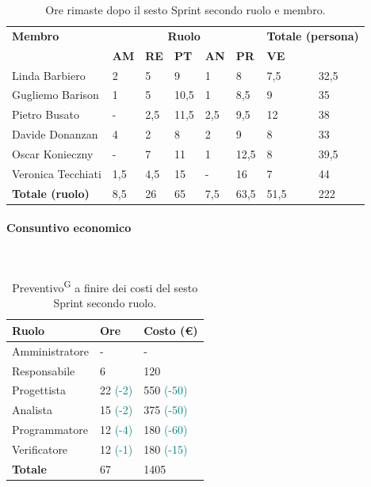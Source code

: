\documentclass[8pt]{article}
\newcommand{\glossterm}[1]{#1\textsuperscript{G}} %
\newcommand{\subsubsubsection}[1]{\paragraph{#1}\mbox{}\\}
\begin{document}
\begin{table}[ht!]
	\centering
	\begin{tabular}{p{3cm} p{1.4cm} p{1.6cm} p{1.5cm} p{1.5cm} p{1.5cm} p{1.5cm} p{2cm}}
		\toprule
        \textbf{Membro} & \multicolumn{5}{c}{\textbf{Ruolo}} & \multicolumn{2}{r}{\textbf{Totale (persona)}}\\
		& \textbf{AM} & \textbf{RE} & \textbf{PT} & \textbf{AN} & \textbf{PR} & \textbf{VE}\\
		\midrule
        Linda Barbiero     & 2    & 5   & 9    & 1   & 8    & 7,5 & 32,5 \\
        Gugliemo Barison   & 1    & 5   & 10,5 & 1   & 8,5  & 9   & 35 \\
        Pietro Busato      & -   & 2,5 & 11,5 & 2,5 & 9,5  & 12  & 38 \\
        Davide Donanzan    & 4    & 2   & 8    & 2   & 9    & 8   & 33 \\
        Oscar Konieczny    & - & 7   & 11   & 1   & 12,5 & 8   & 39,5 \\
        Veronica Tecchiati & 1,5  & 4,5 & 15   & -   & 16   & 7   & 44 \\
        \midrule
        \textbf{Totale (ruolo)} & 8,5 & 26 & 65 & 7,5 & 63,5 & 51,5 & 222 \\
		\bottomrule
	\end{tabular}
	\caption{Ore rimaste dopo il sesto Sprint secondo ruolo e membro.}
	\label{table:Ore rimaste dopo il sesto Sprint secondo ruolo e membro.}
\end{table}
\subsubsubsection{Consuntivo economico}
\begin{table}[ht!]
    \centering
    \begin{tabular}{p{4cm} p{1.8cm} p{2.2cm}}
        \toprule
        \textbf{Ruolo} & \textbf{Ore} & \textbf{Costo (€)} \\
        \midrule
        Amministratore & -                         & -   \\
        Responsabile   & 6                         & 120 \\
        Progettista    & 22 \textcolor{teal}{(-2)} & 550 \textcolor{teal}{(-50)} \\
        Analista       & 15 \textcolor{teal}{(-2)} & 375 \textcolor{teal}{(-50)} \\
        Programmatore  & 12 \textcolor{teal}{(-4)} & 180 \textcolor{teal}{(-60)} \\
        Verificatore   & 12 \textcolor{teal}{(-1)} & 180 \textcolor{teal}{(-15)} \\
        \bottomrule
        \textbf{Totale} & 67 & 1405
    \end{tabular}
    \caption{\glossterm{Preventivo} a finire dei costi del sesto Sprint secondo ruolo.}
    \label{table:Preventivo a finire dei costi del sesto Sprint secondo ruolo}
\end{table}
\end{document}
